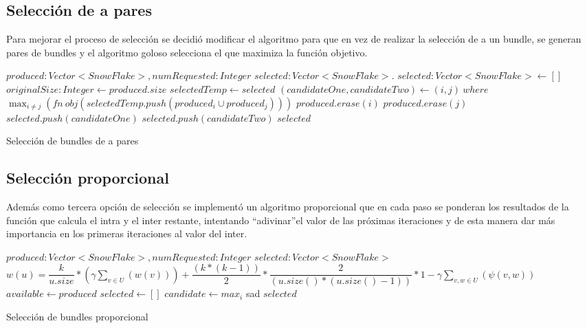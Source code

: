 \subsection{Selección de a pares}
Para mejorar el proceso de selección se decidió modificar el algoritmo para que en vez de realizar 
la selección de a un bundle, se generan pares de bundles y el algoritmo goloso selecciona el que 
maximiza la función objetivo.
\begin{algorithm}[H]
\begin{algorithmic}[1]
\REQUIRE $produced:Vector<SnowFlake>, numRequested:Integer$
\ENSURE $selected:Vector<SnowFlake>$.
\STATE $selected:Vector<SnowFlake> \leftarrow []$
\STATE $originalSize:Integer \leftarrow produced.size$
\STATE $selectedTemp \leftarrow selected$
\STATE $(candidateOne, candidateTwo) \leftarrow (i, j)\ where$ \\ 
$\displaystyle\max_{i \neq j} (fn\ obj(selectedTemp.push(produced_{i} \cup produced_{j})))$
\STATE $produced.erase(i)$
\STATE $produced.erase(j)$
\STATE $selected.push(candidateOne)$
\STATE $selected.push(candidateTwo)$
\ENDWHILE
\RETURN $selected$
\end{algorithmic}
\caption{Selección de bundles de a pares}\label{alg:algSelTuple}
\end{algorithm}
\subsection{Selección proporcional}
Además como tercera opción de selección se implementó un algoritmo proporcional que en cada paso se 
ponderan los resultados de la función que calcula el intra y el inter restante, intentando 
\textquotedblleft adivinar\textquotedblright  el valor de las próximas iteraciones y de esta manera 
dar más importancia en los primeras iteraciones al valor del inter.
\begin{algorithm}[H]
\begin{algorithmic}[1]
\REQUIRE $produced:Vector<SnowFlake>, numRequested:Integer$
\ENSURE $selected:Vector<SnowFlake>$
\STATE $w(u) = \dfrac{k}{u.size} * (\gamma \sum_{v \in U}(w(v))) + \dfrac{(k * (k-1))}{2} * \dfrac{2}{(u.size() * (u.size() - 1))} * 1 - \gamma \sum_{v,w \in U}(\psi(v,w))$
\STATE $available \leftarrow produced$
\STATE $selected \leftarrow []$
\STATE $candidate \leftarrow max_{i}$
\ENDWHILE sad
\RETURN $selected$
\end{algorithmic}
\caption{Selección de bundles proporcional}\label{alg:algSelProp}
\end{algorithm}

